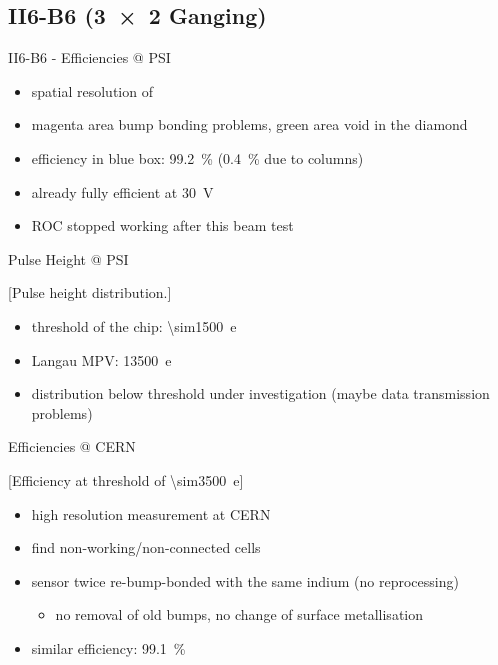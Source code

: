 \subsection{II6-B6 (\SI{3x2}{} Ganging)}
\begin{frame}{II6-B6 - Efficiencies @ PSI}

	
	\begin{itemize}\itemfill
		\item spatial resolution of 
		\item magenta area \ra bump bonding problems, green area \ra void in the diamond
		\item efficiency in blue box: \SI{99.2}{\%} (\ra \SI{.4}{\%} due to columns)
		\item already fully efficient at \SI{30}{\volt}
		\item ROC stopped working after this beam test
	\end{itemize}
	
\end{frame}
\begin{frame}{Pulse Height @ PSI}

	[Pulse height distribution.]	
	
	\begin{itemize}\itemfill
		\item threshold of the chip: \SI{\sim1500}{e}
		\item Langau MPV: \SI{13500}{e}
		\item distribution below threshold under investigation (maybe data transmission problems)
	\end{itemize}
	
\end{frame}
\begin{frame}{Efficiencies @ CERN}

	\vspace*{-2ex}[Efficiency at threshold of \SI{\sim3500}{e}]\vspace*{-2ex}
	
	\begin{itemize}\itemfill
		\item high resolution measurement at CERN
		\item find non-working/non-connected cells
		\item sensor twice re-bump-bonded with the same indium (no reprocessing)
		\begin{itemize}
			\item no removal of old bumps, no change of surface metallisation
		\end{itemize}
		\item similar efficiency: \SI{99.1}{\%}
	\end{itemize}
	
\end{frame}
